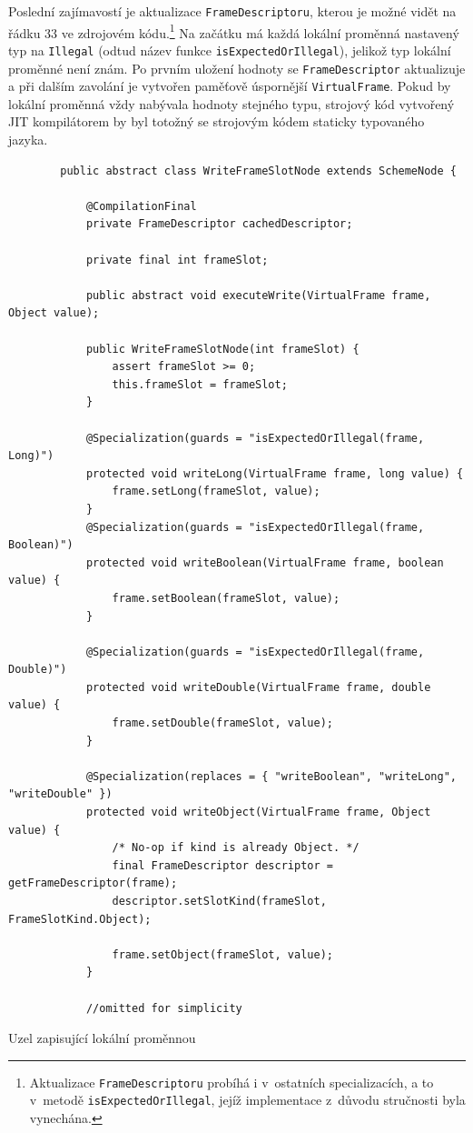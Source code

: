 \documentclass[
  master,
  biblatex,
  figures=true,
  theorems,
  sourcecodes,
  glossaries,
  index
]{kidiplom}
\begin{document}
Poslední zajímavostí je aktualizace \texttt{FrameDescriptoru}, kterou je možné vidět na řádku 33 ve zdrojovém kódu.\footnote{Aktualizace \texttt{FrameDescriptoru} probíhá i v~ostatních specializacích, a to v~metodě \texttt{isExpectedOrIllegal}, jejíž implementace z~důvodu stručnosti byla vynechána.} Na začátku má každá lokální proměnná nastavený typ na \texttt{Illegal} (odtud název funkce \texttt{isExpectedOrIllegal}), jelikož typ lokální proměnné není znám. Po prvním uložení hodnoty se \texttt{Frame\-Descriptor} aktualizuje a při dalším zavolání je vytvořen paměťově úspornější \texttt{VirtualFrame}. Pokud by lokální proměnná vždy nabývala hodnoty stejného typu, strojový kód vytvořený JIT kompilátorem by byl totožný se strojovým kódem staticky typovaného jazyka.

\begin{listing} 
    \begin{verbatim}
        public abstract class WriteFrameSlotNode extends SchemeNode {
        
            @CompilationFinal
            private FrameDescriptor cachedDescriptor;
        
            private final int frameSlot;
        
            public abstract void executeWrite(VirtualFrame frame, Object value);
        
            public WriteFrameSlotNode(int frameSlot) {
                assert frameSlot >= 0;
                this.frameSlot = frameSlot;
            }
        
            @Specialization(guards = "isExpectedOrIllegal(frame, Long)")
            protected void writeLong(VirtualFrame frame, long value) {
                frame.setLong(frameSlot, value);
            }
            @Specialization(guards = "isExpectedOrIllegal(frame, Boolean)")
            protected void writeBoolean(VirtualFrame frame, boolean value) {
                frame.setBoolean(frameSlot, value);
            }
        
            @Specialization(guards = "isExpectedOrIllegal(frame, Double)")
            protected void writeDouble(VirtualFrame frame, double value) {
                frame.setDouble(frameSlot, value);
            }
        
            @Specialization(replaces = { "writeBoolean", "writeLong", "writeDouble" })
            protected void writeObject(VirtualFrame frame, Object value) {
                /* No-op if kind is already Object. */
                final FrameDescriptor descriptor = getFrameDescriptor(frame);
                descriptor.setSlotKind(frameSlot, FrameSlotKind.Object);
        
                frame.setObject(frameSlot, value);
            }
        
            //omitted for simplicity
    \end{verbatim}
    \caption{Uzel zapisující lokální proměnnou}
    \label{WriteFrameSlotNode}
\end{listing}
\end{document}
